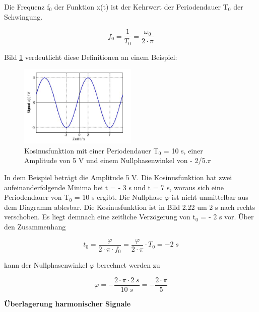 \noindent Die Frequenz f${}_{0}$ der Funktion x(t) ist der Kehrwert der Periodendauer T${}_{0}$ der Schwingung.

\begin{equation}\label{eq:onesixtynine}
f_{0} =\dfrac{1}{T_{0} } =\dfrac{\omega _{0} }{2\cdot \pi }
\end{equation}

\clearpage
\noindent Bild \ref{fig:Inconnue} verdeutlicht diese Definitionen an einem Beispiel:

\begin{figure}[ht]
  \centerline{\includegraphics[width=0.5\textwidth]{Kapitel1/Bilder/image22.JPG}}
  \caption{Kosinusfunktion mit einer Periodendauer T${}_{0}$ = 10 s, einer Amplitude von 5 V und einem Nullphasenwinkel von - 2/5$.$$\pi$ }
  \label{fig:Inconnue}
\end{figure}

\noindent In dem Beispiel beträgt die Amplitude 5 V. Die Kosinusfunktion hat zwei aufeinanderfolgende Minima bei t = - 3 s und t = 7 s, woraus sich eine Periodendauer von T${}_{0}$ = 10 s ergibt. Die Nullphase $\varphi$ ist nicht unmittelbar aus dem Diagramm ablesbar. Die Kosinusfunktion ist in Bild 2.22 um 2 s nach rechts verschoben. Es liegt demnach eine zeitliche Verz\"{o}gerung von t${}_{0}$ = - 2 s vor. \"{U}ber den Zusammenhang

\begin{equation}\label{eq:oneseventy}
t_{0} =\dfrac{\varphi }{2\cdot \pi \cdot f_{0} } =\dfrac{\varphi }{2\cdot \pi } \cdot T_{0} =-2 \; s
\end{equation}


\noindent kann der Nullphasenwinkel $\varphi$ berechnet werden zu

\begin{equation}\label{eq:oneseventyone}
\varphi =-\dfrac{2\cdot \pi \cdot 2\;s}{10\;s} =-\dfrac{2\cdot \pi }{5}
\end{equation}

\bigskip

{\selectfont
\noindent\textbf{\"{U}berlagerung harmonischer Signale}} \smallskip

